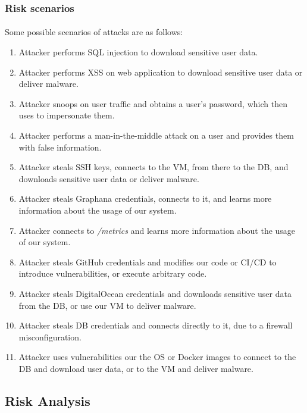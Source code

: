 \subsubsection{Risk scenarios}
\paragraph{} Some possible scenarios of attacks are as follows:
\begin{enumerate}
	\item Attacker performs SQL injection to download sensitive user data.
	\item Attacker performs XSS on web application to download sensitive user data or deliver malware.
	\item Attacker snoops on user traffic and obtains a user's password, which then uses to impersonate them.
	\item Attacker performs a man-in-the-middle attack on a user and provides them with false information.
	\item Attacker steals SSH keys, connects to the VM, from there to the DB, and downloads sensitive user data or deliver malware.
	\item Attacker steals Graphana credentials, connects to it, and learns more information about the usage of our system.
	\item Attacker connects to \textit{/metrics} and learns more information about the usage of our system.
	\item Attacker steals GitHub credentials and modifies our code or CI/CD to introduce vulnerabilities, or execute arbitrary code.
	\item Attacker steals DigitalOcean credentials and downloads sensitive user data from the DB, or use our VM to deliver malware.
	\item Attacker steals DB credentials and connects directly to it, due to a firewall misconfiguration.
	\item Attacker uses vulnerabilities our the OS or Docker images to connect to the DB and download user data, or to the VM and deliver malware.
\end{enumerate}

\subsection{Risk Analysis}
